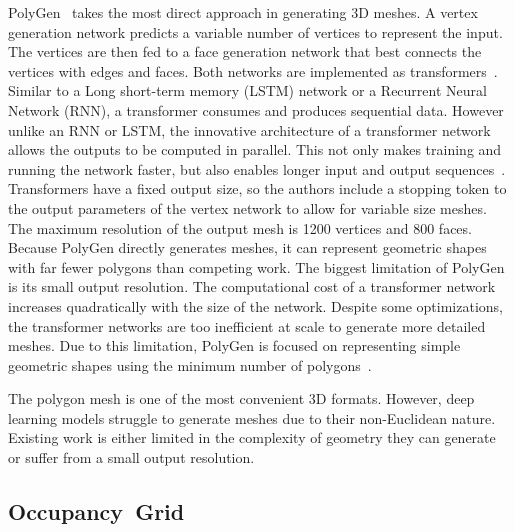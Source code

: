 \newpage

PolyGen~\cite{Nash2020} takes the most direct approach in generating 3D meshes. A vertex generation network predicts a variable number of vertices to represent the input. The vertices are then fed to a face generation network that best connects the vertices with edges and faces. Both networks are implemented as transformers~\cite{Nash2020}. Similar to a Long short-term memory (LSTM) network or a Recurrent Neural Network (RNN), a transformer consumes and produces sequential data. However unlike  an RNN or LSTM, the innovative architecture of a transformer network allows the outputs to be computed in parallel. This not only makes training and running the network faster, but also enables longer input and output sequences~\cite{Vaswani2017}. Transformers have a fixed output size, so the authors include a stopping token to the output parameters of the vertex network to allow for variable size meshes. The maximum resolution of the output mesh is 1200 vertices and 800 faces. Because PolyGen directly generates meshes, it can represent geometric shapes with far fewer polygons than competing work. The biggest limitation of PolyGen is its small output resolution. The computational cost of a transformer network increases quadratically with the size of the network. Despite some optimizations, the transformer networks are too inefficient at scale to generate more detailed meshes. Due to this limitation, PolyGen is focused on representing simple geometric shapes using the minimum number of polygons~\cite{Nash2020}.

The polygon mesh is one of the most convenient 3D formats. However, deep learning models struggle to generate meshes due to their non-Euclidean nature. Existing work is either limited in the complexity of geometry they can generate or suffer from a small output resolution.

\newpage


\subsection{Occupancy~Grid}
\label{subsec:occupancy_grid}

